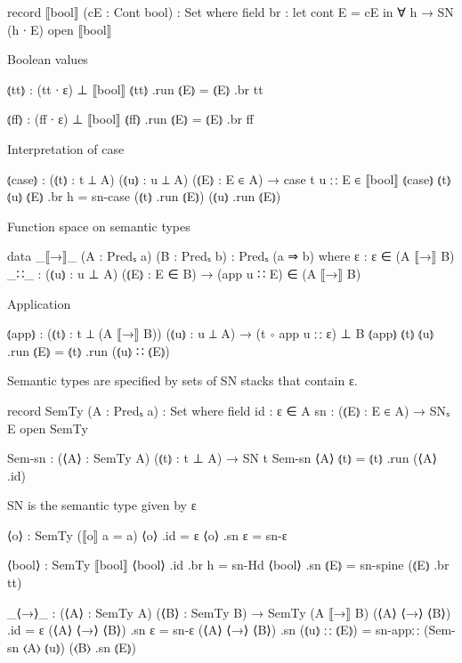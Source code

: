 \begin{code}
record ⟦bool⟧ (cE : Cont bool) : Set where
  field br : let cont E = cE in ∀ h → SN (h ∙ E)
open ⟦bool⟧
\end{code}

Boolean values

\begin{code}
⦅tt⦆ : (tt ∙ ε) ⊥ ⟦bool⟧
⦅tt⦆ .run ⦅E⦆ = ⦅E⦆ .br tt

⦅ff⦆ : (ff ∙ ε) ⊥ ⟦bool⟧
⦅ff⦆ .run ⦅E⦆ = ⦅E⦆ .br ff
\end{code}

Interpretation of case

\begin{code}
⦅case⦆  :  (⦅t⦆ : t ⊥ A)
           (⦅u⦆ : u ⊥ A)
           (⦅E⦆ : E ∈ A)
        →  case t u ∷ E ∈ ⟦bool⟧
⦅case⦆ ⦅t⦆ ⦅u⦆ ⦅E⦆ .br h = sn-case (⦅t⦆ .run ⦅E⦆) (⦅u⦆ .run ⦅E⦆)
\end{code}

Function space on semantic types

\begin{code}
data _⟦→⟧_ (A : Predₛ a) (B : Predₛ b) : Predₛ (a ⇒ b) where
  ε    : ε ∈ (A ⟦→⟧ B)
  _∷_  : (⦅u⦆ : u ⊥ A) (⦅E⦆ : E ∈ B) → (app u ∷ E) ∈ (A ⟦→⟧ B)
\end{code}

Application

\begin{code}
⦅app⦆  :  (⦅t⦆ : t ⊥ (A ⟦→⟧ B))
          (⦅u⦆ : u ⊥ A)
       →  (t ∘ app u ∷ ε) ⊥ B
⦅app⦆ ⦅t⦆ ⦅u⦆ .run ⦅E⦆ = ⦅t⦆ .run (⦅u⦆ ∷ ⦅E⦆)
\end{code}


Semantic types are specified by sets of SN stacks that contain ε.

\begin{code}
record SemTy (A : Predₛ a) : Set where
  field
    id  : ε ∈ A
    sn  : (⦅E⦆ : E ∈ A) → SNₛ E
open SemTy

Sem-sn : (⟨A⟩ : SemTy A) (⦅t⦆ : t ⊥ A) → SN t
Sem-sn ⟨A⟩ ⦅t⦆ = ⦅t⦆ .run (⟨A⟩ .id)
\end{code}


SN is the semantic type given by {ε}

\begin{code}
⟨o⟩ : SemTy (⟦o⟧ {a = a})
⟨o⟩ .id    = ε
⟨o⟩ .sn ε  = sn-ε

⟨bool⟩ : SemTy ⟦bool⟧
⟨bool⟩ .id .br h  = sn-Hd
⟨bool⟩ .sn  ⦅E⦆    = sn-spine (⦅E⦆ .br tt)

_⟨→⟩_ : (⟨A⟩ : SemTy A) (⟨B⟩ : SemTy B) → SemTy (A ⟦→⟧ B)
(⟨A⟩ ⟨→⟩ ⟨B⟩) .id            = ε
(⟨A⟩ ⟨→⟩ ⟨B⟩) .sn ε          = sn-ε
(⟨A⟩ ⟨→⟩ ⟨B⟩) .sn (⦅u⦆ ∷ ⦅E⦆)  = sn-app∷ (Sem-sn ⟨A⟩ ⦅u⦆) (⟨B⟩ .sn ⦅E⦆)
\end{code}

